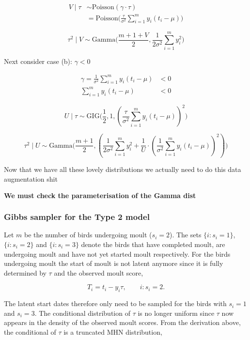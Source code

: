 \documentclass[
  12pt,
]{article}
\begin{document}
\[
\begin{aligned}
V \mid \tau & \sim \text{Poisson}(\gamma \cdot \tau) \\
& = \text{Poisson}\big(\frac{\tau}{\sigma^2} \sum^m_{i=1} y_i(t_i-\mu)\big)
\end{aligned}
\]

\[
\tau^2 \mid V \sim \text{Gamma}\big(\frac{m+1+V}{2},\frac{1}{2\sigma^2} \sum^m_{i=1} y_i^2\big)
\]

Next consider case (b): \(\gamma < 0\)

\[
\begin{aligned}
\gamma = \frac{1}{\sigma^2} \sum^m_{i=1} y_i(t_i-\mu) & < 0 \\
\sum^m_{i=1} y_i(t_i-\mu) & < 0
\end{aligned}
\]

\[
U \mid \tau \sim \text{GIG}\big(\frac{1}{2},1,(\frac{\tau}{\sigma^2} \sum^m_{i=1} y_i(t_i-\mu))^2\big)
\]

\[
\tau^2 \mid U \sim \text{Gamma}\big(\frac{m+1}{2}, (\frac{1}{2\sigma^2} \sum^m_{i=1} y_i^2 + \frac{1}{U}\cdot(\frac{1}{\sigma^2} \sum^m_{i=1} y_i(t_i-\mu))^2)\big)
\]

Now that we have all these lovely distributions we actually need to do
this data augmentation shit

\textbf{We must check the parameterisation of the Gamma dist}

\subsubsection{Gibbs sampler for the Type 2
model}\label{gibbs-sampler-for-the-type-2-model}

Let \(m\) be the number of birds undergoing moult (\(s_i = 2\)). The
sets \(\{i: s_i = 1\}\), \(\{i: s_i = 2\}\) and \(\{i: s_i = 3\}\)
denote the birds that have completed moult, are undergoing moult and
have not yet started moult respectively. For the birds undergoing moult
the start of moult is not latent anymore since it is fully determined by
\(\tau\) and the observed moult score,

\[
T_i = t_i - y_i \tau, \qquad i: s_i = 2.
\]

The latent start dates therefore only need to be sampled for the birds
with \(s_i = 1\) and \(s_i = 3\). The conditional distribution of
\(\tau\) is no longer uniform since \(\tau\) now appears in the density
of the observed moult scores. From the derivation above, the conditional
of \(\tau\) is a truncated MHN distribution,
\end{document}
